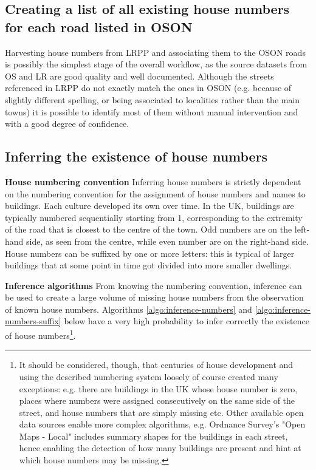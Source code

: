 \subsection{Creating a list of all existing house numbers for each road listed in OSON} 

Harvesting house numbers from LRPP and associating them to the OSON roads is possibly the simplest stage of the overall workflow, as the source datasets from OS and LR are good quality and well documented. Although the streets referenced in LRPP do not exactly match the ones in OSON (e.g. because of slightly different spelling, or being associated to localities rather than the main towns) it is possible to identify most of them without manual intervention and with a good degree of confidence.

\subsection{Inferring the existence of house numbers} 
\label{inference-algorithms} 

\textbf{House numbering convention} Inferring house numbers is strictly dependent on the numbering convention for the assignment of house numbers and names to buildings. Each culture developed its own over time. In the UK, buildings are typically numbered sequentially starting from 1, corresponding to the extremity of the road that is closest to the centre of the town. Odd numbers are on the left-hand side, as seen from the centre, while even number are on the right-hand side. House numbers can be suffixed by one or more letters: this is typical of larger buildings that at some point in time got divided into more smaller dwellings. 
        
\textbf{Inference algorithms} From knowing the numbering convention, inference can be used to create a large volume of missing house numbers from the observation of known house numbers. Algorithms \ref{algo:inference-numbers} and \ref{algo:inference-numbers-suffix} below have a very high probability to infer correctly the existence of house numbers\footnote{It should be considered, though, that centuries of house development and using the described numbering system loosely of course created many exceptions: e.g. there are buildings in the UK whose house number is zero, places where numbers were assigned consecutively on the same side of the street, and house numbers that are simply missing etc. Other available open data sources enable more complex algorithms, e.g. Ordnance Survey's "Open Maps - Local" includes summary shapes for the buildings in each street, hence enabling the detection of how many buildings are present and hint at which house numbers may be missing.}. 


